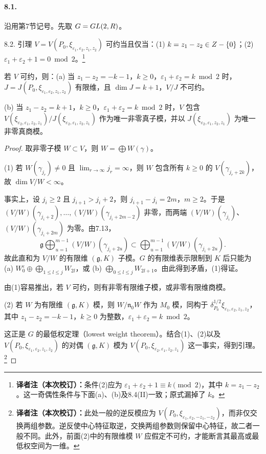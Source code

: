 \paragraph*{8.1.} 沿用第7节记号。先取 $G=GL(2,R)$。
\begin{originaltheorem}{8.2. 引理}
$V=V(P_0,\xi_{\varepsilon_1,\varepsilon_2,z_1,z_2})$ 可约当且仅当：(1) $k=z_1-z_2\in Z-\{0\}$；(2) $\varepsilon_1+\varepsilon_2+1=0\bmod2$。\footnote{\textbf{译者注（本次校订）：}条件(2)应为 $\varepsilon_1+\varepsilon_2+1\equiv k\pmod2$，其中 $k=z_1-z_2$。这一奇偶性条件与下面(a)、(b)及8.4(II)一致；原式漏掉了 $k$。}

若 $V$ 可约，则：(a) 当 $z_1-z_2=-k-1$，$k\ge0$，$\varepsilon_1+\varepsilon_2=k\bmod2$ 时，$J=J(P_0,\xi_{\varepsilon_1,\varepsilon_2,z_1,z_2})$ 有限维，且 $\dim J=k+1$，$V/J$ 不可约。

(b) 当 $z_1-z_2=k+1$，$k\ge0$，$\varepsilon_1+\varepsilon_2=k\bmod2$ 时，$V$ 包含 $V(\xi_{\varepsilon_2,\varepsilon_1,z_2,z_1})/J(\xi_{\varepsilon_2,\varepsilon_1,z_2,z_1})$ 作为唯一非零真子模，并以 $J(\xi_{\varepsilon_2,\varepsilon_1,z_2,z_1})$ 为唯一非零真商模。
\end{originaltheorem}
\begin{proof}
取非零子模 $W\subset V$，则 $W=\bigoplus W(\gamma)$。

(1) 若 $W(\gamma_{j_r})\ne0$ 且 $\lim_{r\to\infty}j_r=\infty$，则 $W$ 包含所有 $k\ge0$ 的 $V(\gamma_{j_r+2k})$，故 $\dim V/W<\infty$。

事实上，设 $j_i\ge2$ 且 $j_{i+1}>j_i+2$，则 $j_{i+1}-j_i=2m$，$m\ge2$。于是 $(V/W)(\gamma_{j_i+2}),\ldots,(V/W)(\gamma_{j_i+2m-2})$ 非零，而两端 $(V/W)(\gamma_{j_i})$、$(V/W)(\gamma_{j_i+2m})$ 为零。由7.13，
\[
 \mathfrak g\bigoplus_{u=1}^{m-1}(V/W)(\gamma_{j_i+2u})
 \subset\bigoplus_{u=1}^{m-1}(V/W)(\gamma_{j_i+2u}).
\]
故此直和为 $V/W$ 的有限维 $(\mathfrak g,K)$ 子模。$G$ 的有限维表示限制到 $K$ 后只能为 (a) $W_0^\varepsilon\oplus\bigoplus_{1\le l\le j}W_{2l}$，或 (b) $\bigoplus_{0\le l\le j}W_{2l+1}$。由此得到矛盾，(1)得证。

由(1)容易推出，若 $V$ 可约，则有非零有限维子模，或非零有限维商模。

(2) 若 $W$ 为有限维 $(\mathfrak g,K)$ 模，则 $W/\mathfrak n_0W$ 作为 $M_0$ 模，同构于 $\delta_{P_0}^{1/2}\xi_{\varepsilon_1,\varepsilon_2,z_1,z_2}$，其中 $z_1-z_2=-k-1$，$k\ge0$ 为整数，$\varepsilon_1+\varepsilon_2=k\bmod2$。

这正是 $G$ 的最低权定理（lowest weight theorem）。结合(1)、(2)以及 $V(P_0,\xi_{\varepsilon_1,\varepsilon_2,z_1,z_2})$ 的对偶 $(\mathfrak g,K)$ 模为 $V(P_0,\xi_{\varepsilon_2,\varepsilon_1,z_2,z_1})$ 这一事实，得到引理。\footnote{\textbf{译者注（本次校订）：}此处一般的逆反模应为 $V(P_0,\xi_{\varepsilon_1,\varepsilon_2,-z_1,-z_2})$，而非仅交换两组参数。逆反使中心特征取逆，交换两组参数则保留中心特征，故二者一般不同。此外，前面(2)中的有限维模 $W$ 应假定不可约，才能断言其最高或最低权空间为一维。}
\end{proof}
